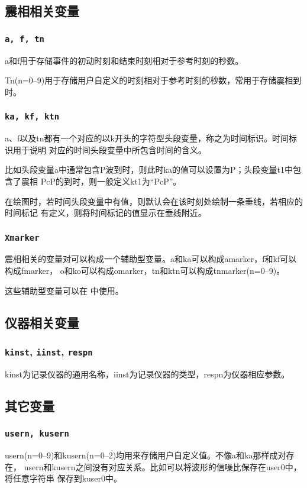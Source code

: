 \subsection{震相相关变量}
\subsubsection{\texttt{a, f, tn}}
a和f用于存储事件的初动时刻和结束时刻相对于参考时刻的秒数。

Tn(n=0--9)用于存储用户自定义的时刻相对于参考时刻的秒数，常用于存储震相到时。

\subsubsection{\texttt{ka, kf, ktn}}
a、f以及tn都有一个对应的以k开头的字符型头段变量，称之为时间标识。时间标识用于说明
对应的时间头段变量中所包含时间的含义。

比如头段变量a中通常包含P波到时，则此时ka的值可以设置为P；头段变量t1中包含了震相
PcP的到时，则一般定义kt1为``PcP''。

在绘图时，若时间头段变量中有值，则默认会在该时刻处绘制一条垂线，若相应的时间标记
有定义，则将时间标记的值显示在垂线附近。

\subsubsection{\texttt{Xmarker}}
震相相关的变量对可以构成一个辅助型变量。a和ka可以构成amarker，f和kf可以构成fmarker，
o和ko可以构成omarker，tn和ktn可以构成tnmarker(n=0--9)。

这些辅助型变量可以在  中使用。

\subsection{仪器相关变量}
\subsubsection{\texttt{kinst}, \texttt{iinst}\dag, \texttt{respn}\dag}
kinst为记录仪器的通用名称，iinst为记录仪器的类型，respn为仪器相应参数。

\subsection{其它变量}
\subsubsection{\texttt{usern, kusern}}
usern(n=0--9)和kusern(n=0--2)均用来存储用户自定义值。不像a和ka那样成对存在，
usern和kusern之间没有对应关系。比如可以将波形的信噪比保存在user0中，将任意字符串
保存到kuser0中。

